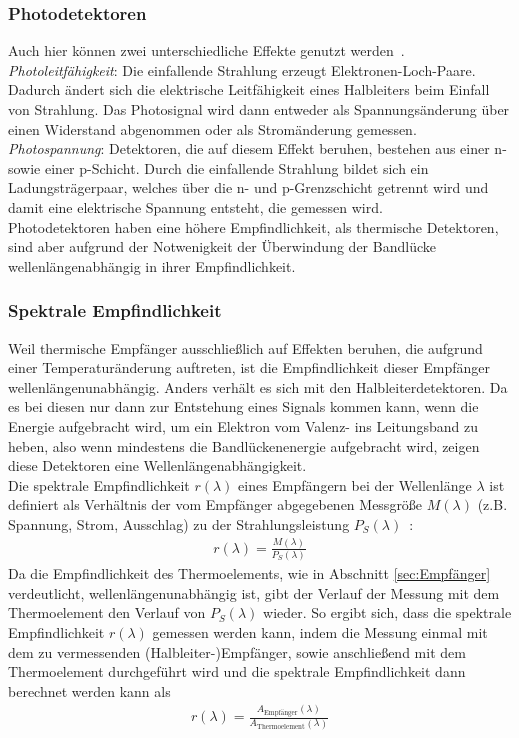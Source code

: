 \documentclass[a4paper,twoside,final]{article}
\begin{document}
\subsubsection{Photodetektoren}
Auch hier können zwei unterschiedliche Effekte genutzt werden~\cite{Gunzler}.\\
\emph{Photoleitfähigkeit}: Die einfallende Strahlung erzeugt Elektronen-Loch-Paare. Dadurch ändert sich die elektrische Leitfähigkeit eines Halbleiters beim Einfall von Strahlung. Das Photosignal wird dann entweder als Spannungsänderung über einen Widerstand abgenommen oder als Stromänderung gemessen. \\
\emph{Photospannung}: Detektoren, die auf diesem Effekt beruhen, bestehen aus einer n- sowie einer p-Schicht. Durch die einfallende Strahlung bildet sich ein Ladungsträgerpaar, welches über die n- und p-Grenzschicht getrennt wird und damit eine elektrische Spannung entsteht, die gemessen wird. \\
Photodetektoren haben eine höhere Empfindlichkeit, als thermische Detektoren, sind aber aufgrund der Notwenigkeit der Überwindung der Bandlücke wellenlängenabhängig in ihrer Empfindlichkeit.

\subsubsection{Spektrale Empfindlichkeit}
Weil thermische Empfänger ausschließlich auf Effekten beruhen, die aufgrund einer Temperaturänderung auftreten, ist die Empfindlichkeit dieser Empfänger wellenlängenunabhängig. Anders verhält es sich mit den Halbleiterdetektoren. Da es bei diesen nur dann zur Entstehung eines Signals kommen kann, wenn die Energie aufgebracht wird, um ein Elektron vom Valenz- ins Leitungsband zu heben, also wenn mindestens die Bandlückenenergie aufgebracht wird, zeigen diese Detektoren eine Wellenlängenabhängigkeit. \\
Die spektrale Empfindlichkeit $r(\lambda)$ eines Empfängern bei der Wellenlänge $\lambda$ ist definiert als Verhältnis der vom Empfänger abgegebenen Messgröße $M(\lambda)$ (z.B. Spannung, Strom, Ausschlag) zu der Strahlungsleistung $P_S(\lambda)$~\cite{Mutschke}:
\begin{align}
  r(\lambda) = \frac{M(\lambda)}{P_S(\lambda)}
\end{align}
Da die Empfindlichkeit des Thermoelements, wie in Abschnitt \ref{sec:Empfänger} verdeutlicht, wellenlängenunabhängig ist, gibt der Verlauf der Messung mit dem Thermoelement den Verlauf von $P_S(\lambda)$ wieder. So ergibt sich, dass die spektrale Empfindlichkeit $r(\lambda)$ gemessen werden kann, indem die Messung einmal mit dem zu vermessenden (Halbleiter-)Empfänger, sowie anschließend mit dem Thermoelement durchgeführt wird und die spektrale Empfindlichkeit dann berechnet werden kann als
\begin{align}
  r(\lambda) = \frac{A_\text{Empfänger}(\lambda)}{A_\text{Thermoelement}(\lambda)}
\end{align}
\end{document}

